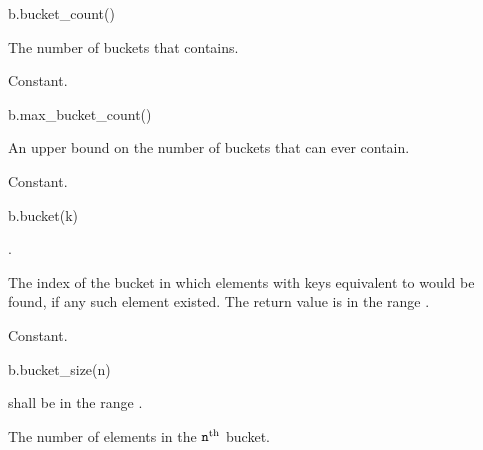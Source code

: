 %
\begin{itemdecl}
b.bucket_count()
\end{itemdecl}

\begin{itemdescr}
\pnum
\result
{}

\pnum
\returns
The number of buckets that  contains.

\pnum
\complexity
Constant.
\end{itemdescr}

%
\begin{itemdecl}
b.max_bucket_count()
\end{itemdecl}

\begin{itemdescr}
\pnum
\result
{}

\pnum
\returns
An upper bound on the number of buckets that  can ever contain.

\pnum
\complexity
Constant.
\end{itemdescr}

%
\begin{itemdecl}
b.bucket(k)
\end{itemdecl}

\begin{itemdescr}
\pnum
\result
{}

\pnum
\expects
{}.

\pnum
\returns
The index of the bucket
in which elements with keys equivalent to  would be found,
if any such element existed.
The return value is in the range \tcode{[0, b.bucket_count())}.

\pnum
\complexity
Constant.
\end{itemdescr}

%
\begin{itemdecl}
b.bucket_size(n)
\end{itemdecl}

\begin{itemdescr}
\pnum
\result
{}

\pnum
\expects
{} shall be in the range \tcode{[0, b.bucket_count())}.

\pnum
\returns
The number of elements in the $\texttt{n}^\text{th}$ bucket.

\pnum
\complexity
{}
\end{itemdescr}

